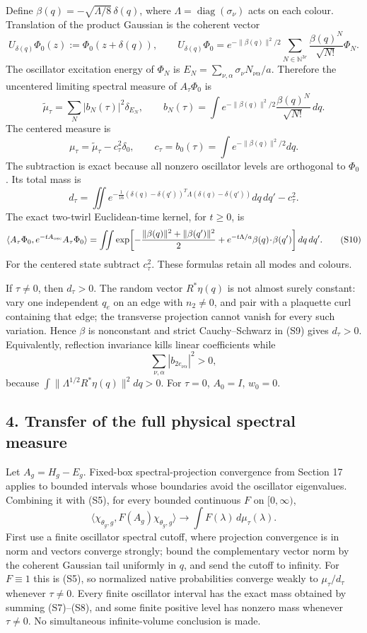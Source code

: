 \documentclass[
  11pt,
]{article}
\begin{document}
Define \(\beta(q)=-\sqrt{\Lambda/8}\,\delta(q)\), where
\(\Lambda=\operatorname{diag}(\sigma_\nu)\) acts on each colour.
Translation of the product Gaussian is the coherent vector \[
 U_{\delta(q)}\Phi_0(z):=\Phi_0(z+\delta(q)),\qquad
 U_{\delta(q)}\Phi_0=e^{-\|\beta(q)\|^2/2}\sum_{N\in\mathbb N^{3r}}
 \frac{\beta(q)^N}{\sqrt{N!}}\Phi_N . \tag{S6}
\] The oscillator excitation energy of \(\Phi_N\) is
\(E_N=\sum_{\nu,\alpha}\sigma_\nu N_{\nu\alpha}/a\). Therefore the
uncentered limiting spectral measure of \(A_\tau\Phi_0\) is \[
 \widetilde\mu_\tau=\sum_N |b_N(\tau)|^2\delta_{E_N},\qquad
 b_N(\tau)=\int e^{-\|\beta(q)\|^2/2}\frac{\beta(q)^N}{\sqrt{N!}}\,dq. \tag{S7}
\] The centered measure is \[
 \mu_\tau=\widetilde\mu_\tau-c_\tau^2\delta_0,\qquad
 c_\tau=b_0(\tau)=\int e^{-\|\beta(q)\|^2/2}dq. \tag{S8}
\] The subtraction is exact because all nonzero oscillator levels are
orthogonal to \(\Phi_0\). Its total mass is \[
 d_\tau=\iint e^{-\frac1{16}(\delta(q)-\delta(q'))^T\Lambda(\delta(q)-\delta(q'))}dq\,dq'-c_\tau^2. \tag{S9}
\] The exact two-twirl Euclidean-time kernel, for \(t\ge0\), is \[
 \langle A_\tau\Phi_0,e^{-tA_{\rm osc}}A_\tau\Phi_0\rangle
 =\iint\exp\!\left[-\frac{\|\beta(q)\|^2+\|\beta(q')\|^2}{2}
 +e^{-t\Lambda/a}\beta(q)\!\cdot\!\beta(q')\right]dq\,dq'. \tag{S10}
\] For the centered state subtract \(c_\tau^2\). These formulas retain
all modes and colours.

If \(\tau\ne0\), then \(d_\tau>0\). The random vector \(R^*\eta(q)\) is
not almost surely constant: vary one independent \(q_e\) on an edge with
\(n_2\ne0\), and pair with a plaquette curl containing that edge; the
transverse projection cannot vanish for every such variation. Hence
\(\beta\) is nonconstant and strict Cauchy--Schwarz in (S9) gives
\(d_\tau>0\). Equivalently, reflection invariance kills linear
coefficients while \[
 \sum_{\nu,\alpha}|b_{2e_{\nu\alpha}}|^2>0,
\] because \(\int\|\Lambda^{1/2}R^*\eta(q)\|^2dq>0\). For \(\tau=0\),
\(A_0=I\), \(w_0=0\).

\subsection{4. Transfer of the full physical spectral
measure}\label{transfer-of-the-full-physical-spectral-measure}

Let \(A_g=H_g-E_g\). Fixed-box spectral-projection convergence from
Section 17 applies to bounded intervals whose boundaries avoid the
oscillator eigenvalues. Combining it with (S5), for every bounded
continuous \(F\) on \([0,\infty)\), \[
 \langle\chi_{\theta_g,g},F(A_g)\chi_{\theta_g,g}\rangle
 \longrightarrow\int F(\lambda)\,d\mu_\tau(\lambda). \tag{S11}
\] First use a finite oscillator spectral cutoff, where projection
convergence is in norm and vectors converge strongly; bound the
complementary vector norm by the coherent Gaussian tail uniformly in
\(q\), and send the cutoff to infinity. For \(F\equiv1\) this is (S5),
so normalized native probabilities converge weakly to
\(\mu_\tau/d_\tau\) whenever \(\tau\ne0\). Every finite oscillator
interval has the exact mass obtained by summing (S7)--(S8), and some
finite positive level has nonzero mass whenever \(\tau\ne0\). No
simultaneous infinite-volume conclusion is made.
\end{document}
